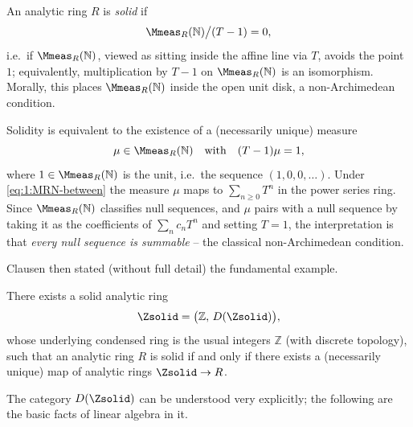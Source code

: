 \begin{definition}
\label{def:1:solid}
An analytic ring $R$ is \emph{solid} if
\begin{equation*}
\Mmeas_R(\mathbb{N})\big/(T-1)=0,
\end{equation*}
i.e.\ if $\Mmeas_R(\mathbb{N})$, viewed as sitting inside the affine line via
$T$, avoids the point $1$; equivalently, multiplication by $T-1$ on
$\Mmeas_R(\mathbb{N})$ is an isomorphism. Morally, this places
$\Mmeas_R(\mathbb{N})$ inside the open unit disk, a non-Archimedean condition.
\end{definition}

\begin{remark}
\label{rmk:1:solid-summable}
Solidity is equivalent to the existence of a (necessarily unique) measure
\begin{equation*}
\mu\in\Mmeas_R(\mathbb{N})\quad\text{with}\quad (T-1)\mu=1,
\end{equation*}
where $1\in\Mmeas_R(\mathbb{N})$ is the unit, i.e.\ the sequence
$(1,0,0,\dots)$. Under \eqref{eq:1:MRN-between} the measure $\mu$ maps to
$\sum_{n\geq 0} T^{n}$ in the power series ring. Since $\Mmeas_R(\mathbb{N})$
classifies null sequences, and $\mu$ pairs with a null sequence by taking it as
the coefficients of $\sum_n c_n T^n$ and setting $T=1$, the interpretation is
that \emph{every null sequence is summable} -- the classical non-Archimedean
condition.
\end{remark}

Clausen then stated (without full detail) the fundamental example.

\begin{theorem}
\label{thm:1:Zsolid}
There exists a solid analytic ring
\[
\Zsolid=\bigl(\mathbb{Z},\,D(\Zsolid)\bigr),
\]
whose underlying condensed ring is the usual integers $\mathbb{Z}$ (with discrete
topology), such that an analytic ring $R$ is solid if and only if there exists a
(necessarily unique) map of analytic rings $\Zsolid\to R$.
\end{theorem}

The category $D(\Zsolid)$ can be understood very explicitly; the following are
the basic facts of linear algebra in it.

